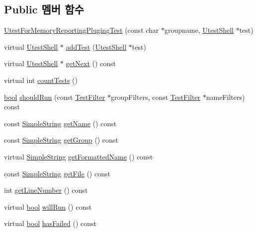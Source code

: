 \subsection*{Public 멤버 함수}
\begin{DoxyCompactItemize}
\item 
\hyperlink{class_utest_for_memory_reporting_pluging_test_aa8c9201a86b2eb4b2472aac3dc20e9ab}{Utest\+For\+Memory\+Reporting\+Pluging\+Test} (const char $\ast$groupname, \hyperlink{class_utest_shell}{Utest\+Shell} $\ast$test)
\item 
virtual \hyperlink{class_utest_shell}{Utest\+Shell} $\ast$ \hyperlink{class_utest_shell_a107d518376747143c07442a9e957b613}{add\+Test} (\hyperlink{class_utest_shell}{Utest\+Shell} $\ast$test)
\item 
virtual \hyperlink{class_utest_shell}{Utest\+Shell} $\ast$ \hyperlink{class_utest_shell_a1ac818ddaedf486843c68a5852de42ff}{get\+Next} () const 
\item 
virtual int \hyperlink{class_utest_shell_aabfe7889f5907ce121416805431c4866}{count\+Tests} ()
\item 
\hyperlink{avb__gptp_8h_af6a258d8f3ee5206d682d799316314b1}{bool} \hyperlink{class_utest_shell_aecee9fc54f1114c23fd48360855b8d46}{should\+Run} (const \hyperlink{class_test_filter}{Test\+Filter} $\ast$group\+Filters, const \hyperlink{class_test_filter}{Test\+Filter} $\ast$name\+Filters) const 
\item 
const \hyperlink{class_simple_string}{Simple\+String} \hyperlink{class_utest_shell_a454500e4f7023136a9a6a956323e3a77}{get\+Name} () const 
\item 
const \hyperlink{class_simple_string}{Simple\+String} \hyperlink{class_utest_shell_a9d203c5f3c7cb6d28b66189a20735dca}{get\+Group} () const 
\item 
virtual \hyperlink{class_simple_string}{Simple\+String} \hyperlink{class_utest_shell_af1b3219048ca8ae0e2bb935b813b4b92}{get\+Formatted\+Name} () const 
\item 
const \hyperlink{class_simple_string}{Simple\+String} \hyperlink{class_utest_shell_ac086867db63bc447ebef78844034d289}{get\+File} () const 
\item 
int \hyperlink{class_utest_shell_ae48a165945bebe01fd777069441e614e}{get\+Line\+Number} () const 
\item 
virtual \hyperlink{avb__gptp_8h_af6a258d8f3ee5206d682d799316314b1}{bool} \hyperlink{class_utest_shell_afa35d9bf0fd1c772b04f48d89d318a70}{will\+Run} () const 
\item 
virtual \hyperlink{avb__gptp_8h_af6a258d8f3ee5206d682d799316314b1}{bool} \hyperlink{class_utest_shell_ae4deec08ed507f9a2f1cced854fc5a16}{has\+Failed} () const 

\end{DoxyCompactItemize}

